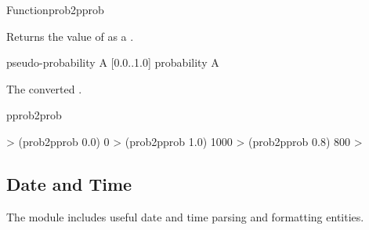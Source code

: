 \documentclass[10pt,twoside,english,pdftex]{article}
\begin{document}

\begin{functiondoc}{Function}{prob2pprob}%
  {
    }
%
%

\fnsyntax

\fnpurpose Returns the value of  as a
.

\fnpackage {}

\fnmodule {}

\fnargs
\begin{args}{pseudo-probability}
\arg[probability] A [0.0..1.0] probability
 A  
\end{args}

\fnreturns The converted .

\begin{alsos}{pprob2prob}
\end{alsos}

\fnexamples
\begin{example}
%
\W\supp
  > (prob2pprob 0.0)
  0
  > (prob2pprob 1.0)
  1000
  > (prob2pprob 0.8)
  800
  > 
\end{example}

\end{functiondoc}


\T\markright{}%
\T\pagestyle{plain}
\T\clearpage
\W{}
\T\pagestyle{fancy}
\T\thispagestyle{fancybottom}
\T\global\def\fnlastname{ }%

\subsection{Date and Time}
\label{sec:dateandtime}%

%
The  module includes useful date and
time parsing and formatting entities.
\end{document}
